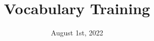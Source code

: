 \documentclass{ctexart}
\title{Vocabulary Training}
\date{August 1st, 2022}
\begin{document}
\maketitle
\begin{multicols}{2}
\end{multicols}
\end{document}
